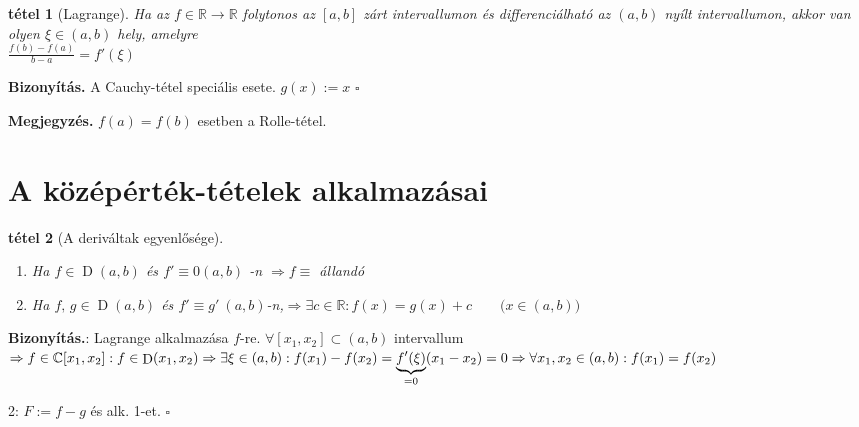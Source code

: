 \documentclass{article}
\newcommand{\ob}{\hfill$\square$}
\newcommand{\ff}{f\in\mathbb{R}\rightarrow\mathbb{R}}
\newcommand{\R}{\mathbb{R}}
\newcommand{\C}{\mathbb{C}}
\newcommand{\nn}{\Rightarrow}
\newcommand{\di}{\displaystyle}
\theoremstyle{magyar}
\newtheorem{te}{tétel}[section]
\newenvironment{biz}{\begin{trivlist}\item\relax\mbox{\textbf{Bizonyítás.\enskip}}\ignorespaces}{\ob\end{trivlist}}
\newenvironment{megj}{\begin{trivlist}\item\relax\mbox{\textbf{Megjegyzés.\enskip}}\ignorespaces}{\end{trivlist}}
\DeclareMathOperator{\D}{D}
\begin{document}
  \begin{te}[Lagrange]
    Ha az $\ff$ folytonos az $[a,b]$ zárt intervallumon és differenciálható az 
    $(a,b)$ nyílt intervallumon, akkor van olyen $\xi\in(a,b)$ hely, amelyre\\
    $\di\frac{f(b)-f(a)}{b-a}=f'(\xi)$
  \end{te}
  \begin{biz}
    A Cauchy-tétel speciális esete. $g(x):=x$
  \end{biz}
  \begin{megj}
   	$f(a)=f(b)$ esetben a Rolle-tétel.
  \end{megj}
  \newpage

  \section{A középérték-tételek alkalmazásai}
  \begin{te}[A deriváltak egyenlősége]\ 
    \begin{enumerate}
    \item Ha $f\in \D(a,b)$ és $f' \equiv 0 (a,b)$ -n 
      $\nn f \equiv $ állandó
      \item Ha $f,\,g \in \D(a,b)$ és $f' \equiv g'\ (a,b)$-n,$\nn 
	\exists c \in\R: f(x) = g(x) +c\qquad \big(x\in(a,b)\big)$
    \end{enumerate}
    
  \end{te}

  \begin{biz}
    1: Lagrange alkalmazása $f$-re. $\forall [x_1,x_2]\subset(a,b)$
    intervallum\\ $\nn f\in \C[x_1,x_2]: f\in \D(x_1,x_2) \nn \exists \xi
    \in (a,b): f(x_1)-f(x_2) = \underbrace{f'(\xi)}_{=0}(x_1-x_2) = 0\\
    \nn
    \forall x_1,x_2\in(a,b): f(x_1)=f(x_2)$

    2: $ F := f-g$ és alk. 1-et.
  \end{biz}
\end{document}

